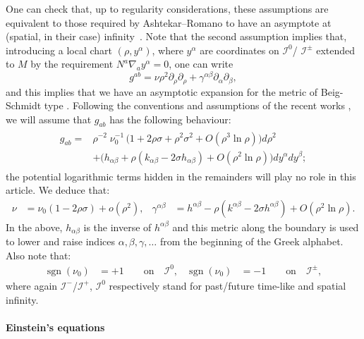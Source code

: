 \documentclass[a4paper, 10pt]{article}
\theoremstyle{remark}
\newcommand{\badat}{\begin{alignedat}}
\newcommand{\eadat}{\end{alignedat}}
\DeclareMathOperator{\sgn}{sgn}
\begin{document}
One can check that, up to regularity considerations, these assumptions are equivalent to those required by Ashtekar--Romano to have an asymptote at (spatial, in their case) infinity~\cite{Ashtekar:1991vb}. Note that the second assumption implies that, introducing a local chart $(\rho, y^{\alpha})$, where $y^{\alpha}$ are coordinates on $\mathcal{I}^{0}$/ $\mathcal{I}^{\pm}$ extended to $M$ by the requirement $N^a \nabla_a y^{\alpha}=0$, one can write
\begin{equation}
g^{ab} =  \nu \rho^2  \partial_\rho \partial_\rho + \gamma^{\alpha \beta} \partial_\alpha \partial_\beta, \label{Eq::InverseMetric}
\end{equation}
and this implies that we have an asymptotic expansion for the metric of Beig-Schmidt type \cite{beig_einsteins_1982}. Following the conventions and assumptions of the recent works \cite{Compere:2011ve,Compere:2023qoa}, we will assume that $g_{ab}$ has the following behaviour:
\begin{align}\label{Ashtekar-Romano: metric Coordinates expansion}
\badat{2}
    g_{ab} =& \rho^{-2}\; \nu_0^{-1}\,\Big(  1 +2 \rho \sigma +\rho^2 \sigma^2 + O(\rho^3 \ln \rho)  \Big) d\rho^2 \\
    &+ \Big( h_{\alpha\beta} + \rho \left( k_{\alpha\beta} -2 \sigma h_{\alpha \beta}\right) +  O(\rho^2 \ln \rho) \Big) d y^{\alpha} d y^{\beta};
\eadat
\end{align}
the potential logarithmic terms hidden in the remainders will play no role in this article. 
We deduce that:
\begin{align}\label{Ashtekar-Romano: Coordinates expansion}
    \nu &= \nu_0\left( 1  - 2 \rho \sigma \right) + o(\rho^{2}),&
    \gamma^{\alpha\beta} &= h^{\alpha\beta} - \rho \left( k^{\alpha\beta} -2 \sigma h^{\alpha \beta}\right) + O(\rho^2\ln\rho).
\end{align}
In the above, $h_{\alpha \beta}$ is the inverse of $h^{\alpha \beta}$ and this metric along the boundary is used to lower and raise indices $\alpha,\beta, \gamma, \dots$ from the beginning of the Greek alphabet. Also note that:
\begin{align}
    \sgn(\nu_0) &= +1 \qquad \text{on} \quad \mathcal{I}^{0}, & \sgn(\nu_0) &= -1 \qquad \text{on} \quad \mathcal{I}^{\pm},
\end{align}
where again $\mathcal{I}^{-}$/$\mathcal{I}^{+}$, $\mathcal{I}^{0}$ respectively stand for past/future time-like and spatial infinity.

\paragraph{Einstein's equations}\mbox{}
\end{document}
